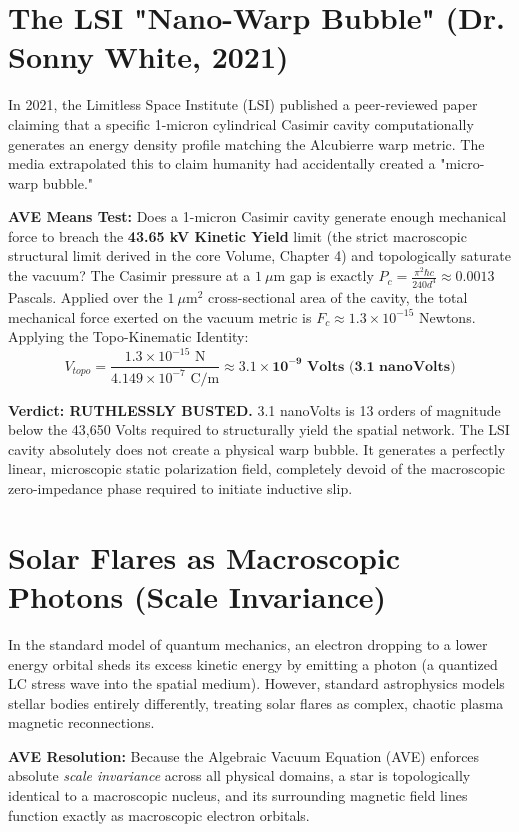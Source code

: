 \section{The LSI "Nano-Warp Bubble" (Dr. Sonny White, 2021)}
In 2021, the Limitless Space Institute (LSI) published a peer-reviewed paper claiming that a specific 1-micron cylindrical Casimir cavity computationally generates an energy density profile matching the Alcubierre warp metric. The media extrapolated this to claim humanity had accidentally created a "micro-warp bubble."

\textbf{AVE Means Test:} Does a 1-micron Casimir cavity generate enough mechanical force to breach the \textbf{43.65 kV Kinetic Yield} limit (the strict macroscopic structural limit derived in the core Volume, Chapter 4) and topologically saturate the vacuum?
The Casimir pressure at a $1 \ \mu$m gap is exactly $P_c = \frac{\pi^2 \hbar c}{240 d^4} \approx 0.0013$ Pascals. Applied over the $1 \ \mu$m$^2$ cross-sectional area of the cavity, the total mechanical force exerted on the vacuum metric is $F_c \approx 1.3 \times 10^{-15}$ Newtons. Applying the Topo-Kinematic Identity:
\begin{equation}
    V_{topo} = \frac{1.3 \times 10^{-15} \text{ N}}{4.149 \times 10^{-7} \text{ C/m}} \approx \mathbf{3.1 \times 10^{-9} \text{ Volts (3.1 nanoVolts)}}
\end{equation}

\textbf{Verdict: RUTHLESSLY BUSTED.} 3.1 nanoVolts is 13 orders of magnitude below the 43,650 Volts required to structurally yield the spatial network. The LSI cavity absolutely does not create a physical warp bubble. It generates a perfectly linear, microscopic static polarization field, completely devoid of the macroscopic zero-impedance phase required to initiate inductive slip. 

\section{Solar Flares as Macroscopic Photons (Scale Invariance)}
In the standard model of quantum mechanics, an electron dropping to a lower energy orbital sheds its excess kinetic energy by emitting a photon (a quantized LC stress wave into the spatial medium). However, standard astrophysics models stellar bodies entirely differently, treating solar flares as complex, chaotic plasma magnetic reconnections.

\textbf{AVE Resolution:} Because the Algebraic Vacuum Equation (AVE) enforces absolute \textit{scale invariance} across all physical domains, a star is topologically identical to a macroscopic nucleus, and its surrounding magnetic field lines function exactly as macroscopic electron orbitals.

